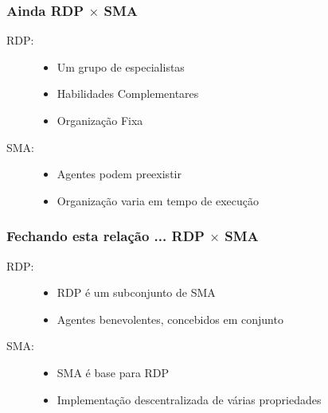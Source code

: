 \begin{frame} %


\frametitle{Ainda RDP $\times$ SMA }

\begin{block}
  
  \begin{description}
    \item[RDP:] 
    \begin{itemize}
      \item Um grupo de especialistas
      \item Habilidades Complementares
      \item Organização Fixa
    \end{itemize}
    
    \item[SMA:]
    
    \begin{itemize}
      \item Agentes podem preexistir
      \item Organização varia em tempo de execução
    \end{itemize}
     
  \end{description}
   
\end{block}

\end{frame}



\begin{frame} %

\frametitle{Fechando esta relação ... RDP $\times$ SMA }

\begin{block}
  
  \begin{description}
    \item[RDP:] 
    \begin{itemize}
      \item RDP é um subconjunto de SMA
      \item Agentes benevolentes, concebidos em conjunto
    \end{itemize}
    
    \item[SMA:]
    \begin{itemize}
      \item SMA é base para RDP
      \item Implementação descentralizada de várias propriedades
    \end{itemize}
     
  \end{description}
   
\end{block}

\end{frame}

